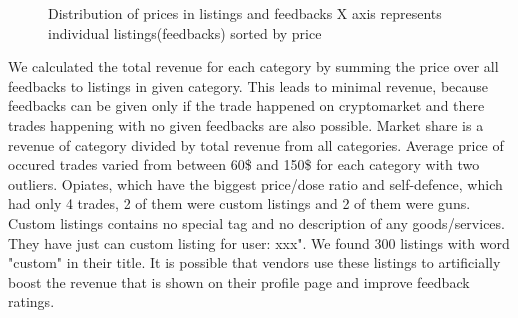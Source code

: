 \documentclass[
  digital, %
  table,   %
  lof,     %
  lot,     %
  oneside
]{fithesis3}
\begin{document}
\begin{figure}[!htb]
\label{listingxprice}
    
\caption[justification=centering]{Distribution of prices in listings and feedbacks\newline
    X axis represents individual listings(feedbacks) sorted by price
}
\end{figure}

We calculated the total revenue for each category
by summing the price over all feedbacks to listings in given category.
This leads to minimal revenue, because feedbacks
can be given only if the trade happened on cryptomarket and there
trades happening with no given feedbacks are also possible.
Market share is a revenue of category divided by total revenue from all categories.
Average price of occured trades varied from between 60\$ and 150\$ for each category
with two outliers. Opiates, which have the biggest price/dose ratio and 
self-defence, which had only 4 trades, 2 of them were custom listings and 2 of them were guns.
Custom listings contains no special tag and no description of any goods/services.
They have just   can custom listing for user: xxx".
We found 300 listings with word "custom" in their title. 
It is possible that vendors use these listings to artificially boost
the revenue that is shown on their profile page and improve feedback ratings.
\end{document}
